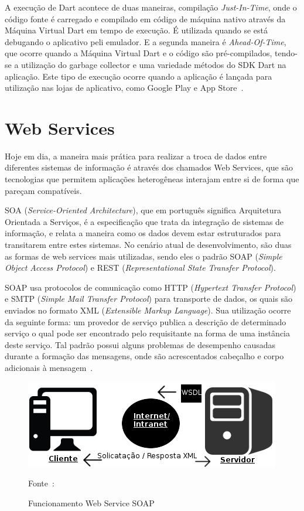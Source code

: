 A execução de Dart acontece de duas maneiras, compilação \textit{Just-In-Time}, onde o código fonte é carregado e compilado em código de máquina nativo através da Máquina Virtual Dart em tempo de execução.
É utilizada quando se está debugando o aplicativo peli emulador.
E a segunda maneira é \textit{Ahead-Of-Time}, que ocorre quando a Máquina Virtual Dart e o código são pré-compilados, tendo-se a utilização do garbage collector e uma variedade métodos do SDK Dart na aplicação.
Este tipo de execução ocorre quando a aplicação é lançada para utilização nas lojas de aplicativo, como Google Play e App Store~\cite{napoli2019beginning}.


\section{Web Services}\label{sec:web-services}


Hoje em dia, a maneira mais prática para realizar a troca de dados entre diferentes sistemas de informação é através dos chamados Web Services\cite{tihomirovs2016webservices}, que são tecnologias que permitem aplicações heterogêneas interajam entre si de forma que pareçam compatíveis\cite{eulalio2016webservices}.


SOA (\textit{Service-Oriented Architecture}), que em português significa Arquitetura Orientada a Serviços, é a especificação que trata da integração de sistemas de informação, e relata a maneira como os dados devem estar estruturados para transitarem entre estes sistemas\cite{eulalio2016webservices}.
No cenário atual de desenvolvimento, são duas as formas de web services mais utilizadas, sendo eles o padrão SOAP (\textit{Simple Object Access Protocol}) e REST (\textit{Representational State Transfer Protocol}).

SOAP usa protocolos de comunicação como HTTP (\textit{Hypertext Transfer Protocol}) e SMTP (\textit{Simple Mail Transfer Protocol}) para transporte de dados, os quais são enviados no formato XML (\textit{Extensible Markup Language}). Sua utilização ocorre da seguinte forma: um provedor de serviço publica a descrição de determinado serviço o qual pode ser encontrado pelo requisitante na forma de uma instância deste serviço.
Tal padrão possui alguns problemas de desempenho causadas durante a formação das mensagens, onde são acrescentados cabeçalho e corpo adicionais à mensagem~\cite{tihomirovs2016webservices}.

\begin{figure}[H]
    \centering
    \includegraphics{imagens/soap}
    \caption{Funcionamento Web Service SOAP}
    Fonte~\cite{eulalio2016webservices}:
    \label{fig: SOAP}
\end{figure}


